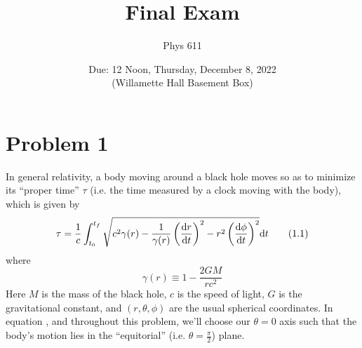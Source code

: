 \documentclass[12pt]{article}
\begin{document}
\title{Final Exam}
\author{Phys 611}
\date{Due: 12 Noon, Thursday, December 8, 2022 \\ (Willamette Hall Basement Box)}
\maketitle

\section*{Problem 1}
In general relativity, a body moving around a black hole moves so as to minimize its ``proper time'' $\tau$ (i.e. the time measured by a clock moving with the body), which is given by
\begin{equation}
    \tau = \frac{1}{c}\int_{t_0}^{t_f}\sqrt{c^2\gamma(r) - \frac{1}{\gamma(r)}\left(\dv{r}{t}\right)^2 - r^2\left(\dv{\phi}{t}\right)^2} \dd t \tag{1.1}\label{eq:1.1}
\end{equation}
where
\begin{equation}
    \gamma(r) \equiv 1 - \frac{2GM}{rc^2} \tag{1.2}\label{eq:1.2}
\end{equation}
Here $M$ is the mass of the black hole, $c$ is the speed of light, $G$ is the gravitational constant, and $(r,\theta,\phi)$ are the usual spherical coordinates. In equation , and throughout this problem, we'll choose our $\theta=0$ axis such that the body's motion lies in the ``equitorial'' (i.e. $\theta=\frac{\pi}{2}$) plane.
\end{document}
